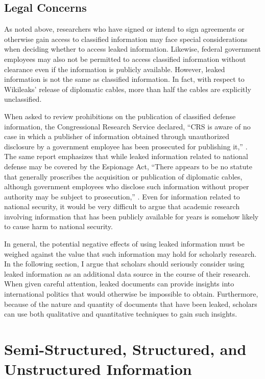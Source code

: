 \documentclass[12pt]{article}
\begin{document}
\subsection{Legal Concerns}

As noted above, researchers who have signed or intend to sign agreements or otherwise gain access to classified information 
may face special considerations when deciding whether to access leaked information. Likewise, federal government 
employees may also not be permitted to 
access classified information without clearance even if the information is publicly available. However, 
leaked information is not the same as classified information. In fact, with respect to 
Wikileaks' release of diplomatic cables, more than half the cables are explicitly unclassified.

When asked to review prohibitions on 
the publication of classified defense information, the Congressional Research Service 
declared, ``CRS is aware of no case in which a publisher of information obtained through unauthorized disclosure by a government
employee has been prosecuted for publishing it,'' \citep[16]{elsea2013criminal}.
The same report emphasizes that while leaked information related to national defense may be covered by the Espionage Act, 
``There appears to be no statute that generally proscribes the acquisition or publication of diplomatic cables, although
government employees who disclose such information without proper authority may be subject to prosecution,'' \citep[14]{elsea2013criminal}.
Even for information related to national security, it would be very difficult to argue that academic research involving information 
that has been publicly available for years is somehow likely to cause harm to national security.

In general, the potential negative effects of using leaked information must be weighed against the value that such 
information may hold for scholarly research. In the following section, I argue that scholars should 
seriously 
consider using leaked information as an additional data source in the course of their research. 
When given careful attention, leaked documents can provide insights into international politics that 
would otherwise be impossible to obtain. Furthermore, because of the nature and quantity of documents 
that have been leaked, scholars can use both qualitative and quantitative techniques to gain such 
insights.

\section{Semi-Structured, Structured, and Unstructured Information}
\end{document}
